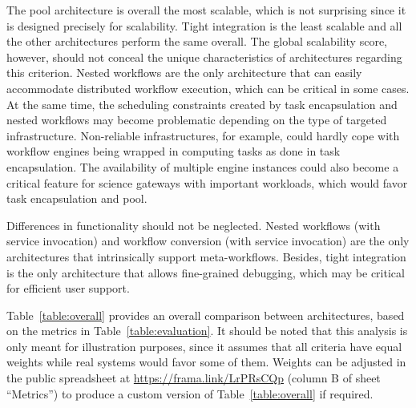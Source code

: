 \documentclass[preprint,3p,twocolumn]{elsarticle}
\newcommand{\correction}[1]{\color{blue}#1\color{black}\xspace}
\begin{document}
The pool architecture is overall the most scalable, which is not
surprising since it is designed precisely for scalability. Tight
integration is the least scalable and all the other architectures
perform the same overall. The global scalability score, however,
should not conceal the unique characteristics of architectures regarding
this criterion. Nested workflows are the only architecture that can
easily accommodate distributed workflow execution, which can be
critical in some cases. At the same time, the scheduling constraints
created by task encapsulation and nested workflows may become problematic  depending on the type of targeted
infrastructure. Non-reliable infrastructures,
for example, could hardly cope with workflow engines being wrapped in
computing tasks as done in task encapsulation. The availability of
multiple engine instances could also become a critical feature for
science gateways with important workloads, which would favor task
encapsulation and pool.

Differences in \correction{functionality} should not be
neglected. Nested workflows (with service invocation) and workflow
conversion (with service invocation) are the only architectures that
intrinsically support meta-workflows. Besides, tight integration is
the only architecture that allows fine-grained debugging, which may be
critical for efficient user support.

Table~\ref{table:overall} provides an overall comparison between
architectures, based on the metrics in Table~\ref{table:evaluation}.
\correction{It should be noted} that this analysis is only meant for illustration purposes, since
it assumes that all criteria have equal weights while real systems
would favor some of them. \correction{Weights can be adjusted in the
  public spreadsheet at \url{https://frama.link/LrPRsCQp} (column B of
  sheet ``Metrics'') to produce a custom version of
  Table~\ref{table:overall} if required.}
\end{document}
